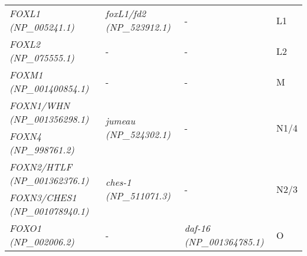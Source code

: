 \documentclass[../main.tex]{subfiles}
\begin{document}
\begin{longtable}{llll}
	\textit{FOXL1 (NP\_005241.1)}                           & \textit{foxL1/fd2 (NP\_523912.1)}                                                                      & -                                                                                                  & L1                    \\ [0.1cm]
	\textit{FOXL2 (NP\_075555.1)}                           & -                                                                                                      & -                                                                                                  & L2                    \\ [0.1cm]
	\textit{FOXM1 (NP\_001400854.1)}                        & -                                                                                                      & -                                                                                                  & M                     \\ [0.1cm]
	\textit{FOXN1/WHN (NP\_001356298.1)}                    & \multirow{2}{*}{\textit{jumeau (NP\_524302.1)}}                                                        & \multirow{2}{*}{-}                                                                                 & \multirow{2}{*}{N1/4} \\
	\textit{FOXN4 (NP\_998761.2)}                           &                                                                                                        &                                                                                                    &                       \\ [0.2cm]
	\textit{FOXN2/HTLF (NP\_001362376.1)}                   & \multirow{2}{*}{\textit{ches-1 (NP\_511071.3)}}                                                        & \multirow{2}{*}{-}                                                                                 & \multirow{2}{*}{N2/3} \\
	\textit{FOXN3/CHES1 (NP\_001078940.1)}                  &                                                                                                        &                                                                                                    &                       \\ [0.2cm]
	\textit{FOXO1 (NP\_002006.2)}                           & \multirow{3}{*}{-}                                                                                     & \multirow{3}{*}{\textit{daf-16 (NP\_001364785.1)}}                                                 & \multirow{3}{*}{O}    \\

\end{longtable}
\end{document}
